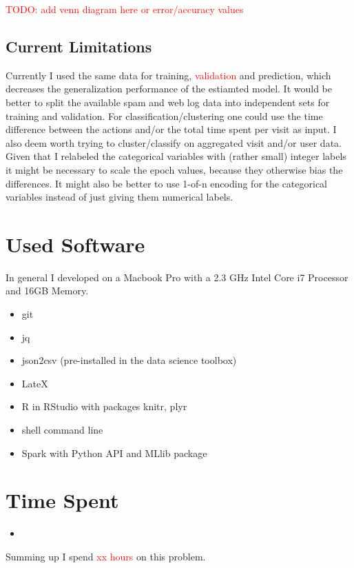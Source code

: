 \documentclass{article}\usepackage[]{graphicx}\usepackage[]{color}
\begin{document}
\textcolor{red}{TODO: add venn diagram here or error/accuracy values}




\subsection{Current Limitations} %
\label{sub:current_limitations}

Currently I used the same data for training, \textcolor{red}{validation} and prediction, which decreases the generalization performance of the estiamted model. It would be better to split the available spam and web log data into independent sets for training and validation.
For classification/clustering one could use the time difference between the actions and/or the total time spent per visit as input. I also deem worth trying to cluster/classify on aggregated visit and/or user data. %
Given that I relabeled the categorical variables with (rather small) integer labels it might be necessary to scale the epoch values, because they otherwise bias the differences. It might also be better to use 1-of-n encoding for the categorical variables instead of just giving them numerical labels.




\section{Used Software}
\label{used_software}
In general I developed on a Macbook Pro with a 2.3 GHz Intel Core i7 Processor and 16GB Memory.

\begin{itemize}
	\item git
	\item jq
	\item json2csv (pre-installed in the data science toolbox)
	\item LateX
	\item R in RStudio with packages knitr, plyr
	\item shell command line
	\item Spark with Python API and MLlib package
\end{itemize}

\section{Time Spent}
\begin{itemize}
	\item 
\end{itemize}

Summing up I spend \textcolor{red}{xx hours} on this problem.
\end{document}
